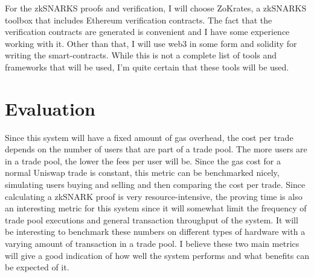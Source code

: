 \documentclass[runningheads]{llncs}
\begin{document}
For the zkSNARKS proofs and verification, I will choose ZoKrates\cite{eberhardt2017zokrates}, a zkSNARKS toolbox that includes Ethereum verification contracts. The fact that the verification contracts are generated is convenient and I have some experience working with it. Other than that, I will use web3 in some form and solidity for writing the smart-contracts. While this is not a complete list of tools and frameworks that will be used, I'm quite certain that these tools will be used.

\section{Evaluation}
Since this system will have a fixed amount of gas overhead, the cost per trade depends on the number of users that are part of a trade pool. The more users are in a trade pool, the lower the fees per user will be. Since the gas cost for a normal Uniswap trade is constant, this metric can be benchmarked nicely, simulating users buying and selling and then comparing the cost per trade. 
Since calculating a zkSNARK proof is very resource-intensive, the proving time is also an interesting metric for this system since it will somewhat limit the frequency of trade pool executions and general transaction throughput of the system. It will be interesting to benchmark these numbers on different types of hardware with a varying amount of transaction in a trade pool. 
I believe these two main metrics will give a good indication of how well the system performs and what benefits can be expected of it. 




\end{document}
